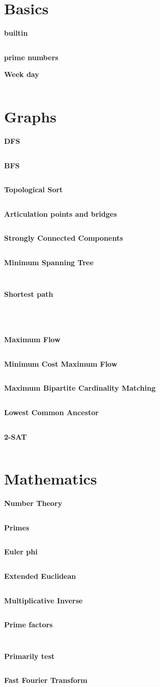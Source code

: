 \documentclass[a4paper, 10pt, twocolumn, landscape]{article}
\begin{document}
  \pagestyle{fancy}

  \setlength{\columnseprule}{1pt}
  \large

  \tableofcontents

  \section{Basics}

  \textbf{builtin}
  \inputminted{cpp}{misc/builtin.cpp}
  \textbf{prime numbers}
  
  \textbf{Week day}
  \inputminted{cpp}{misc/week-day.cpp}

  \section{Graphs}
  \textbf{DFS}
  \inputminted{cpp}{graphs/dfs.cpp}
  \textbf{BFS}
  \inputminted{cpp}{graphs/bfs.cpp}
  \textbf{Topological Sort}
  \inputminted{cpp}{graphs/kahn.cpp}
  \textbf{Articulation points and bridges}
  \inputminted{cpp}{graphs/articulation.cpp}
  \textbf{Strongly Connected Components}
  \inputminted{cpp}{graphs/kosaraju.cpp}
  \textbf{Minimum Spanning Tree}
  \inputminted{cpp}{graphs/kruskal.cpp}
  \inputminted{cpp}{graphs/prim.cpp}
  \textbf{Shortest path}
  \inputminted{cpp}{graphs/dijkstra.cpp}
  \inputminted{cpp}{graphs/bellman-ford.cpp}
  \inputminted{cpp}{graphs/spfa.cpp}
  \inputminted{cpp}{graphs/floyd-warshall.cpp}
  \textbf{Maximum Flow}
  \inputminted{cpp}{graphs/dinic.cpp} %
  \textbf{Minimum Cost Maximum Flow}
  \inputminted{cpp}{graphs/min-cost-max-flow.cpp} %
  \textbf{Maximum Bipartite Cardinality Matching}
  \inputminted{cpp}{graphs/kuhn.cpp}
  \textbf{Lowest Common Ancestor}
  \inputminted{cpp}{graphs/lca.cpp}
  \textbf{2-SAT}
  \inputminted{cpp}{graphs/2-sat.cpp}

  \section{Mathematics}
  \textbf{Number Theory}
  \inputminted{cpp}{math/basics.cpp}
  \textbf{Primes}
  \inputminted{cpp}{math/sieve.cpp}
  \textbf{Euler phi}
  \inputminted{cpp}{math/euler-phi.cpp}
  \textbf{Extended Euclidean}
  \inputminted{cpp}{math/extended-euclid.cpp}
  \textbf{Multiplicative Inverse}
  \inputminted{cpp}{math/mult-inverse.cpp}
  \textbf{Prime factors}
  \inputminted{cpp}{math/prime-factors.cpp}
  \inputminted{cpp}{math/pollard-rho.cpp}
  \textbf{Primarily test}
  \inputminted{cpp}{math/miller-rabin.cpp}
  \textbf{Fast Fourier Transform}
  \inputminted{cpp}{math/fft.cpp}
\end{document}
